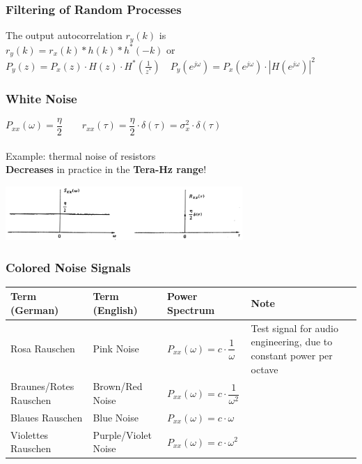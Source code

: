 		\subsubsection{Filtering of Random Processes}
		The output autocorrelation $r_y(k)$ is\\
		 $r_y(k) = r_x(k)\ast h(k) \ast h^*(-k)$ or $\boxed{P_{y}(z) = P_{x}(z)\cdot H(z) \cdot H^*(\frac{1}{z^*}) \quad
		  P_{y}(e^{j\omega})=P_x(e^{j\omega})\cdot|H(e^{j\omega})|^2}$
		
		\subsubsection{White Noise}
		\begin{center}
			\begin{minipage}{8cm}
				$P_{xx}(\omega) = \dfrac{\eta}{2} \qquad r_{xx}(\tau) = \dfrac{\eta}{2} \cdot \delta(\tau)= \sigma_x^2 \cdot \delta(\tau)$ \\ \\
				Example: thermal noise of resistors \\
				\textbf{Decreases} in practice in the \textbf{Tera-Hz range}!
			\end{minipage}
			\begin{minipage}{10cm}
				\includegraphics[width=9cm]{bilder/weisses_rauschen.png}
			\end{minipage}
		\end{center}


		\subsubsection{Colored Noise Signals}
		\renewcommand{\arraystretch}{2}
		\begin{tabular}[c]{ | p{4cm} | p{3.5cm} | p{3cm} | p{6cm} | }
			\hline
				\textbf{Term (German)}
				& \textbf{Term (English)}
				& \textbf{Power Spectrum}
				& \textbf{Note} \\
			\hline
				Rosa Rauschen
				& Pink Noise
				& $P_{xx}(\omega) = c \cdot \dfrac{1}{\omega}$
				& Test signal for audio engineering, due to constant power per octave \\
			\hline
				Braunes/Rotes Rauschen
				& Brown/Red Noise
				&   $P_{xx}(\omega) = c \cdot \dfrac{1}{\omega^2}$
				& \\
			\hline
				Blaues Rauschen
				& Blue Noise
				&   $P_{xx}(\omega) = c \cdot \omega$
				& \\
			\hline
				Violettes Rauschen
				& Purple/Violet Noise
				&   $P_{xx}(\omega) = c \cdot \omega^2$
				& \\
			\hline
		\end{tabular}
		\renewcommand{\arraystretch}{1}


